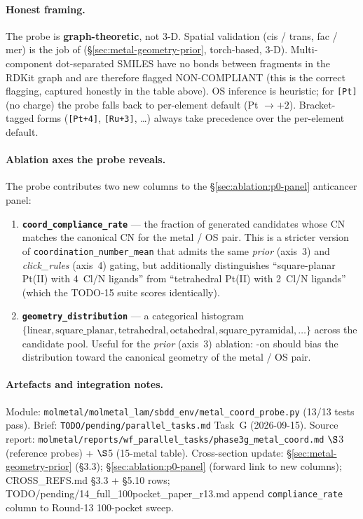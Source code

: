 \paragraph{Honest framing.}
The probe is \textbf{graph-theoretic}, not 3-D.  Spatial
validation (cis / trans, fac / mer) is the job of
\mgp{} (\S\ref{sec:metal-geometry-prior}, torch-based,
3-D).  Multi-component dot-separated SMILES have no bonds
between fragments in the RDKit graph and are therefore flagged
NON-COMPLIANT (this is the correct flagging, captured honestly
in the table above).  OS inference is heuristic; for \texttt{[Pt]}
(no charge) the probe falls back to per-element default
(Pt $\to +2$).  Bracket-tagged forms
(\texttt{[Pt+4]}, \texttt{[Ru+3]}, \dots) always take
precedence over the per-element default.

\paragraph{Ablation axes the probe reveals.}
The probe contributes two new columns to the
\S\ref{sec:ablation:p0-panel} anticancer panel:
\begin{enumerate}
  \item \textbf{\texttt{coord\_compliance\_rate}} --- the
        fraction of generated candidates whose CN matches the
        canonical CN for the metal / OS pair.  This is a
        stricter version of \texttt{coordination\_number\_mean}
        that admits the same \emph{prior} (axis~3) and
        \emph{click\_rules} (axis~4) gating, but additionally
        distinguishes ``square-planar Pt(II) with 4~Cl/N
        ligands'' from ``tetrahedral Pt(II) with 2~Cl/N
        ligands'' (which the TODO-15 suite scores identically).
  \item \textbf{\texttt{geometry\_distribution}} --- a
        categorical histogram
        $\{\mathrm{linear}, \mathrm{square\_planar},
        \mathrm{tetrahedral}, \mathrm{octahedral},
        \mathrm{square\_pyramidal}, \dots\}$ across the
        candidate pool.  Useful for the \emph{prior}
        (axis~3) ablation: \mgp{}-on should bias the
        distribution toward the canonical geometry of the
        metal / OS pair.
\end{enumerate}

\paragraph{Artefacts and integration notes.}
Module: \texttt{molmetal/molmetal\_lam/sbdd\_env/metal\_coord\_probe.py}
(13/13 tests pass).  Brief:
\texttt{TODO/pending/parallel\_tasks.md} Task~G (2026-09-15).
Source report:
\texttt{molmetal/reports/wf\_parallel\_tasks/phase3g\_metal\_coord.md}
$\S$3 (reference probes) + $\S$5 (15-metal table).
Cross-section update: \S\ref{sec:metal-geometry-prior}
(§3.3); §\ref{sec:ablation:p0-panel} (forward link to new
columns); CROSS\_REFS.md §3.3 + §5.10 rows;
TODO/pending/14\_full\_100pocket\_paper\_r13.md append
\texttt{compliance\_rate} column to Round-13 100-pocket sweep.

